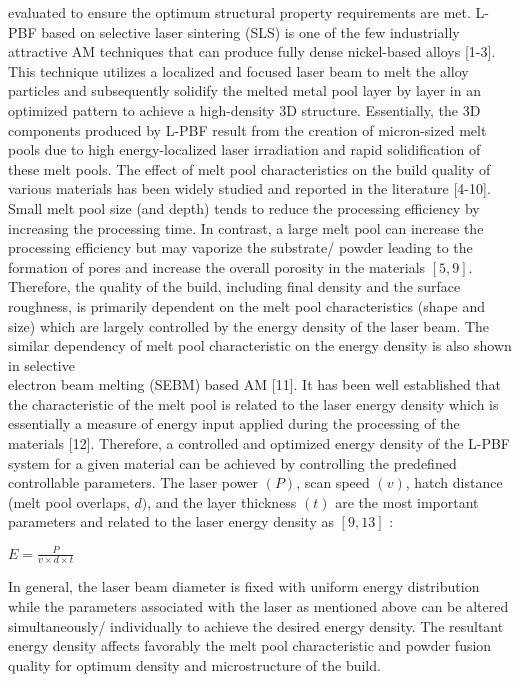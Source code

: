 \documentclass[10pt]{article}
\begin{document}
evaluated to ensure the optimum structural property requirements are met. L-PBF based on selective laser sintering (SLS) is one of the few industrially attractive AM techniques that can produce fully dense nickel-based alloys [1-3]. This technique utilizes a localized and focused laser beam to melt the alloy particles and subsequently solidify the melted metal pool layer by layer in an optimized pattern to achieve a high-density 3D structure. Essentially, the 3D components produced by L-PBF result from the creation of micron-sized melt pools due to high energy-localized laser irradiation and rapid solidification of these melt pools. The effect of melt pool characteristics on the build quality of various materials has been widely studied and reported in the literature [4-10]. Small melt pool size (and depth) tends to reduce the processing efficiency by increasing the processing time. In contrast, a large melt pool can increase the processing efficiency but may vaporize the substrate/ powder leading to the formation of pores and increase the overall porosity in the materials $[5,9]$. Therefore, the quality of the build, including final density and the surface roughness, is primarily dependent on the melt pool characteristics (shape and size) which are largely controlled by the energy density of the laser beam. The similar dependency of melt pool characteristic on the energy density is also shown in selective\\
electron beam melting (SEBM) based AM [11]. It has been well established that the characteristic of the melt pool is related to the laser energy density which is essentially a measure of energy input applied during the processing of the materials [12]. Therefore, a controlled and optimized energy density of the L-PBF system for a given material can be achieved by controlling the predefined controllable parameters. The laser power $(P)$, scan speed $(v)$, hatch distance (melt pool overlaps, $d)$, and the layer thickness $(t)$ are the most important parameters and related to the laser energy density as $[9,13]$ :

$E=\frac{P}{v \times d \times t}$

In general, the laser beam diameter is fixed with uniform energy distribution while the parameters associated with the laser as mentioned above can be altered simultaneously/ individually to achieve the desired energy density. The resultant energy density affects favorably the melt pool characteristic and powder fusion quality for optimum density and microstructure of the build.
\end{document}
